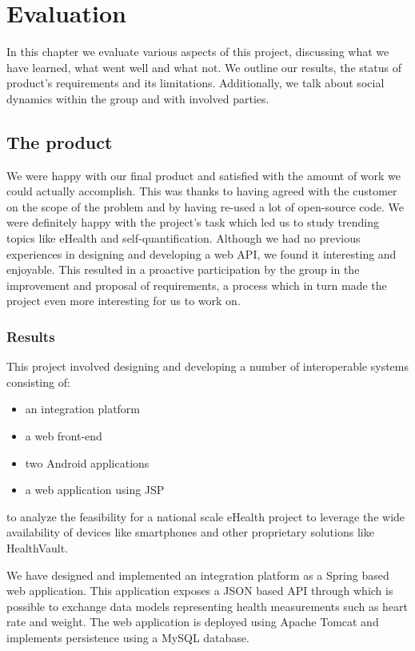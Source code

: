 \chapter{Evaluation} 
\label{ch:evaluation}


In this chapter we evaluate various aspects of this project, discussing what we
have learned, what went well and what not.
We outline our results, the status of product's requirements and its limitations.
Additionally, we talk about social dynamics within the group and with involved parties.

\section{The product}

We were happy with our final product and satisfied with the amount of work we could actually accomplish.
This was thanks to having agreed with the customer on the scope of the problem and by having re-used a
lot of open-source code. We were definitely happy with the project's task which led us to study trending topics
like eHealth and self-quantification. Although we had no previous experiences in designing and developing a web API,
we found it interesting and enjoyable. This resulted in a proactive participation by the group
in the improvement and proposal of requirements, a process which in turn made the project even more interesting
for us to work on.

\subsection{Results}

This project involved designing and developing a number of interoperable systems consisting of:
\begin{itemize}
\item an integration platform
\item a web front-end
\item two Android applications
\item a web application using JSP
\end{itemize}
to analyze the feasibility for a national scale eHealth project to leverage the wide availability of devices
like smartphones and other proprietary solutions like HealthVault.

We have designed and implemented an integration platform as a Spring based web application.
This application exposes a JSON based API through which is possible to exchange data models
representing health measurements such as heart rate and weight.
The web application is deployed using Apache Tomcat and implements persistence using a MySQL database.

